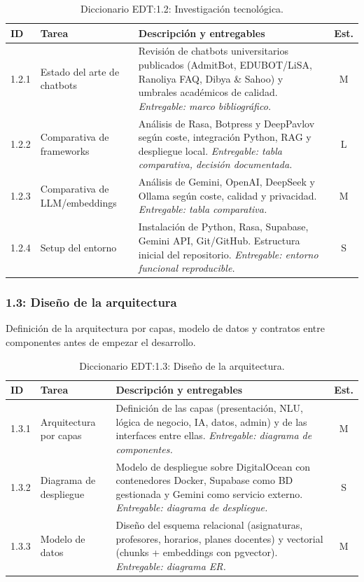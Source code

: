 \begin{table}[hbtp]
\centering
\small
\begin{tabular}{|l|l|p{7.5cm}|c|}
\hline
\textbf{ID} & \textbf{Tarea} & \textbf{Descripción y entregables} & \textbf{Est.} \\ \hline
1.2.1 & Estado del arte de chatbots & Revisión de chatbots universitarios publicados (AdmitBot, EDUBOT/LiSA, Ranoliya FAQ, Dibya \& Sahoo) y umbrales académicos de calidad. \textit{Entregable: marco bibliográfico.} & M \\ \hline
1.2.2 & Comparativa de frameworks & Análisis de Rasa, Botpress y DeepPavlov según coste, integración Python, RAG y despliegue local. \textit{Entregable: tabla comparativa, decisión documentada.} & L \\ \hline
1.2.3 & Comparativa de LLM/embeddings & Análisis de Gemini, OpenAI, DeepSeek y Ollama según coste, calidad y privacidad. \textit{Entregable: tabla comparativa.} & M \\ \hline
1.2.4 & Setup del entorno & Instalación de Python, Rasa, Supabase, Gemini API, Git/GitHub. Estructura inicial del repositorio. \textit{Entregable: entorno funcional reproducible.} & S \\ \hline
\end{tabular}
\caption{Diccionario EDT:1.2: Investigación tecnológica.}
\label{tab:dict-1-2}
\end{table}

\subsubsection{1.3: Diseño de la arquitectura}\label{subsubsec:diseno}

Definición de la arquitectura por capas, modelo de datos y contratos entre componentes antes de empezar el desarrollo.

\begin{table}[hbtp]
\centering
\small
\begin{tabular}{|l|l|p{7.5cm}|c|}
\hline
\textbf{ID} & \textbf{Tarea} & \textbf{Descripción y entregables} & \textbf{Est.} \\ \hline
1.3.1 & Arquitectura por capas & Definición de las capas (presentación, NLU, lógica de negocio, IA, datos, admin) y de las interfaces entre ellas. \textit{Entregable: diagrama de componentes.} & M \\ \hline
1.3.2 & Diagrama de despliegue & Modelo de despliegue sobre DigitalOcean con contenedores Docker, Supabase como BD gestionada y Gemini como servicio externo. \textit{Entregable: diagrama de despliegue.} & S \\ \hline
1.3.3 & Modelo de datos & Diseño del esquema relacional (asignaturas, profesores, horarios, planes docentes) y vectorial (chunks + embeddings con pgvector). \textit{Entregable: diagrama ER.} & M \\ \hline
\end{tabular}
\caption{Diccionario EDT:1.3: Diseño de la arquitectura.}
\label{tab:dict-1-3}
\end{table}

